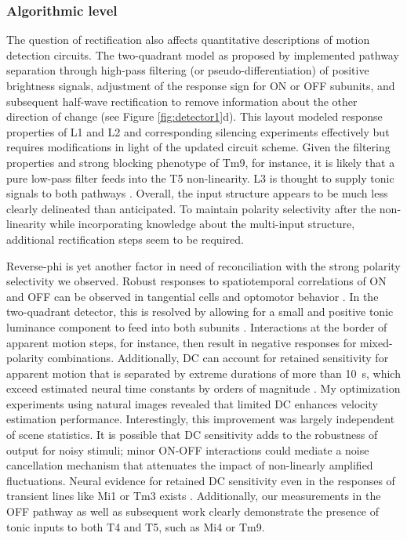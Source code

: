 \subsubsection{Algorithmic level}
The question of rectification also affects quantitative descriptions of motion detection circuits. The two-quadrant model as proposed by \citet{Eichner:2011ic} implemented pathway separation through high-pass filtering (or pseudo-differentiation) of positive brightness signals, adjustment of the response sign for ON or OFF subunits, and subsequent half-wave rectification to remove information about the other direction of change (see Figure \ref{fig:detector1}d). This layout modeled response properties of L1 and L2 and corresponding silencing experiments effectively \citep{Laughlin:1978aa,Joesch:2010fw,Joesch:2013ew} but requires modifications in light of the updated circuit scheme. Given the filtering properties and strong blocking phenotype of Tm9, for instance, it is likely that a pure low-pass filter feeds into the T5 non-linearity. L3 is thought to supply tonic signals to both pathways \citep{Silies:2013jp,Takemura:2017aa}. Overall, the input structure appears to be much less clearly delineated than anticipated. To maintain polarity selectivity after the non-linearity while incorporating knowledge about the multi-input structure, additional rectification steps seem to be required.

Reverse-phi is yet another factor in need of reconciliation with the strong polarity selectivity we observed. Robust responses to spatiotemporal correlations of ON and OFF can be observed in tangential cells \citep{Egelhaaf:1992wh,Eichner:2011ic} and optomotor behavior \citep{Tuthill:2011ic,Clark:2011gw}. In the two-quadrant detector, this is resolved by allowing for a small and positive tonic luminance component to feed into both subunits \citep[see also][]{Kern:2000a}. Interactions at the border of apparent motion steps, for instance, then result in negative responses for mixed-polarity combinations. Additionally, DC can account for retained sensitivity for apparent motion that is separated by extreme durations of more than \SI{10}{\second}, which exceed estimated neural time constants by orders of magnitude \citep{Eichner:2011ic}. My optimization experiments using natural images revealed that limited DC enhances velocity estimation performance. Interestingly, this improvement was largely independent of scene statistics. It is possible that DC sensitivity adds to the robustness of output for noisy stimuli; minor ON-OFF interactions could mediate a noise cancellation mechanism that attenuates the impact of non-linearly amplified fluctuations. Neural evidence for retained DC sensitivity even in the responses of transient lines like Mi1 or Tm3 exists \citep{Behnia:2014jh}. Additionally, our measurements in the OFF pathway as well as subsequent work clearly demonstrate the presence of tonic inputs to both T4 and T5, such as Mi4 or Tm9.

